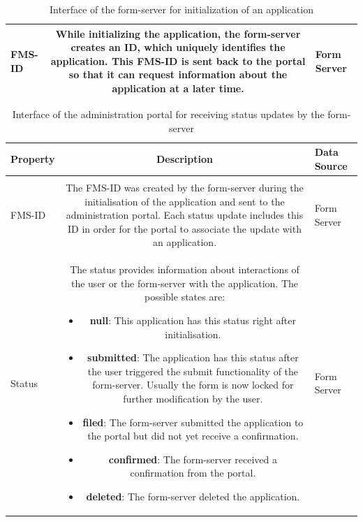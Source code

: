 \documentclass[
     12pt,         %
     a4paper,      %
     BCOR=10mm,version=first,     %
     DIV=14,version=first,        %
     ]{scrreprt}
\begin{document}
\begin{table}[!h]
\begin{tabularx}{\textwidth}{|l|C|l|}
            \hline
            
            FMS-ID & While initializing the application, the form-server creates an ID, which uniquely identifies the application. This FMS-ID is sent back to the portal so that it can request information about the application at a later time. & Form Server \\
            
            \hline
            \end{tabularx}
            \caption{Interface of the form-server for initialization of an application}
            \label{table:interface_form_initialization}
        \end{table}

        \begin{table}[!h]
            \begin{tabularx}{\textwidth}{|l|C|l|}
            \hline
            Property & Description & Data Source \\
            \hline
             \\
            \hline
            
            FMS-ID & The FMS-ID was created by the form-server during the initialisation of the application and sent to the administration portal. Each status update includes this ID in order for the portal to associate the update with an application. & Form Server \\
            
            \hline
            
            Status & The status provides information about interactions of the user or the form-server with the application. The possible states are:
            
            \begin{itemize}
                \item \textbf{null}: This application has this status right after initialisation.
                \item \textbf{submitted}: The application has this status after the user triggered the submit functionality of the form-server. Usually the form is now locked for further modification by the user.
                \item \textbf{filed}: The form-server submitted the application to the portal but did not yet receive a confirmation.
                \item \textbf{confirmed}: The form-server received a confirmation from the portal.
                \item \textbf{deleted}: The form-server deleted the application.
            \end{itemize}
            
            & Form Server \\
            \hline
            \end{tabularx}
            \caption{Interface of the administration portal for receiving status updates by the form-server}
            \label{table:interface_status}
        \end{table}
\end{document}
